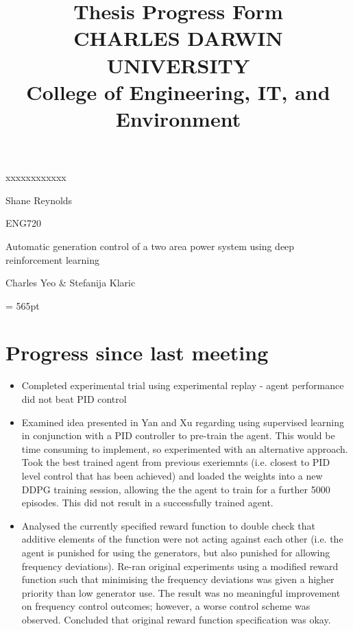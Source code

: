 \documentclass[12pt]{article}
\title{	
		Thesis Progress Form\\
		CHARLES DARWIN UNIVERSITY\\
		College of Engineering, IT, and Environment
	  }
\author{}
\date{}
\begin{document}
	
	\maketitle
	
	\begin{namelist}{xxxxxxxxxxxx}
		\item[{\bf Name:}]
			Shane Reynolds
		\item[{\bf Unit:}]
			ENG720
		\item[{\bf Title:}]
			Automatic generation control of a two area power system using deep reinforcement learning
		\item[{\bf Supervisors:}]
			Charles Yeo \& Stefanija Klaric
		\item[{\bf Time \& Date:} \today \ @ 1pm]
			
	\end{namelist}
	
	\pagestyle{plain} %
	\textheight = 565pt %
	
	\section{Progress since last meeting}
	\begin{itemize}
		\item Completed experimental trial using experimental replay - agent performance did not beat PID control
		\item Examined idea presented in Yan and Xu regarding using supervised learning in conjunction with a PID controller to pre-train the agent. This would be time consuming to implement, so experimented with an alternative approach. Took the best trained agent from previous exeriemnts (i.e. closest to PID level control that has been achieved) and loaded the weights into a new DDPG training session, allowing the the agent to train for a further 5000 episodes. This did not result in a successfully trained agent.
		\item Analysed the currently specified reward function to double check that additive elements of the function were not acting against each other (i.e. the agent is punished for using the generators, but also punished for allowing frequency deviations). Re-ran original experiments using a modified reward function such that minimising the frequency deviations was given a higher priority than low generator use. The result was no meaningful improvement on frequency control outcomes; however, a worse control scheme was observed. Concluded that original reward function specification was okay.
	\end{itemize}
\end{document}
